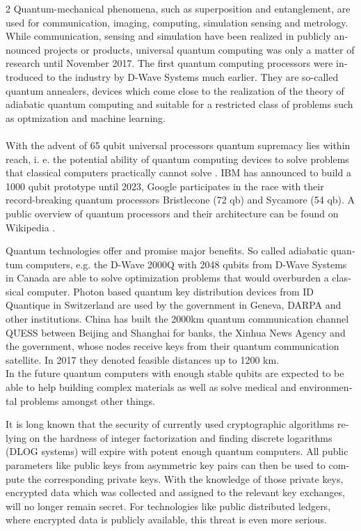 \documentclass[a4paper,11pt]{article}
\begin{document}
\begin{otherlanguage}{english}
\begin{multicols}{2}
Quantum-mechanical phenomena, such as superposition and entanglement, are used for communication, imaging, computing, simulation sensing and metrology. While communication, sensing and simulation have been realized in publicly announced projects or products, universal quantum computing was only a matter of research until November 2017. The first quantum computing processors were introduced to the industry by D-Wave Systems \cite{DWV} much earlier. They are so-called quantum annealers, devices which come close to the realization of the theory of adiabatic quantum computing and suitable for a restricted class of problems such as optmization and machine learning. \\ \\
With the advent of 65 qubit universal processors quantum supremacy lies within reach, i. e. the potential ability of quantum computing devices to solve problems that classical computers practically cannot solve \cite{IEEESpec, googleai}. IBM has announced to build a 1000 qubit prototype until 2023, Google participates in the race with their record-breaking quantum processors Bristlecone (72 qb) and Sycamore (54 qb). A public overview of quantum processors and their architecture can be found on Wikipedia \cite{WIK}. 

Quantum technologies offer and promise major benefits. So called adiabatic quantum computers, e.g. the D-Wave 2000Q with 2048 qubits from D-Wave Systems in Canada are able to solve optimization problems that would overburden a classical computer. Photon based quantum key distribution devices from ID Quantique in Switzerland are used by the government in Geneva, DARPA and other institutions. China has built the 2000km quantum communication channel QUESS between Beijing and Shanghai for banks, the Xinhua News Agency and the government, whose nodes receive keys from their quantum communication satellite. In 2017 they denoted feasible distances up to 1200 km. \\
In the future quantum computers with enough stable qubits are expected to be able to help building complex materials as well as solve medical and environmental problems amongst other things.

It is long known that the security of currently used cryptographic algorithms relying on the hardness of integer factorization and finding discrete logarithms (DLOG systems) \cite{SHO} will expire with potent enough quantum computers. All public parameters like public keys from asymmetric key pairs can then be used to compute the corresponding private keys. With the knowledge of those private keys, encrypted data which was collected and assigned to the relevant key exchanges, will no longer remain secret. For technologies like public distributed ledgers, where encrypted data is publicly available, this threat is even more serious. \\


\end{multicols}
\end{otherlanguage}
\end{document}
